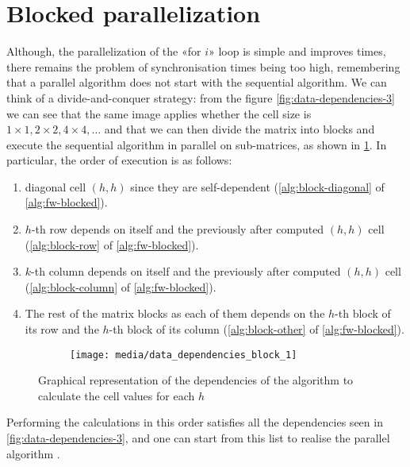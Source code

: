 \section{Blocked parallelization}\label{blocked_parallelization}

Although, the parallelization of the «for \(i\)» loop is simple and improves times, there remains the problem of synchronisation times being too high, remembering that a parallel algorithm does not start with the sequential algorithm.
We can think of a divide-and-conquer strategy: from the figure \cref{fig:data-dependencies-3} we can see that the same image applies whether the cell size is \(1 \times 1,  2 \times 2,  4 \times 4, \dots\) and that we can then divide the matrix into blocks and execute the sequential algorithm in parallel on sub-matrices, as shown in \cref{fig:data-dependency-external-loop-parallel}.
In particular, the order of execution is as follows:
\begin{enumerate}
    \item diagonal cell \((h,h)\) since they are self-dependent (\cref{alg:block-diagonal} of \cref{alg:fw-blocked}).
    \item \(h\)-th row depends on itself and the previously after computed  \((h,h)\) cell (\cref{alg:block-row}  of \cref{alg:fw-blocked}).
    \item \(k\)-th column depends on itself and the previously after computed  \((h,h)\) cell (\cref{alg:block-column}  of \cref{alg:fw-blocked}).
    \item The rest of the matrix blocks as each of them depends on the \(h\)-th block of its row and the \(h\)-th block of its column (\cref{alg:block-other}  of \cref{alg:fw-blocked}).
\end{enumerate}

\begin{figure}[htbp]
    \centering
    \begin{subfigure}[t]{0.8\textwidth}
        \centering
        \texttt{[image: media/data\_dependencies\_block\_1]}
    \end{subfigure}

    \caption{Graphical representation of the dependencies of the algorithm to calculate the cell values for each \(h\)}
    \label{fig:data-dependency-external-loop-parallel}
\end{figure}

Performing the calculations in this order satisfies all the dependencies seen in \cref{fig:data-dependencies-3}, and one can start from this list to realise the parallel algorithm \cite{rucci}.

